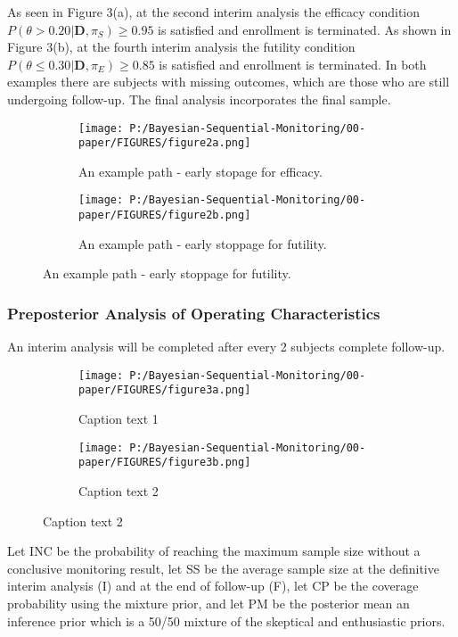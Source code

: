 \documentclass[12pt]{article}
\begin{document}
As seen in Figure 3(a), at the second interim analysis the efficacy condition $P(\theta>0.20|\mathbf{D},\pi_S)\geq 0.95$ is satisfied and enrollment is terminated. As shown in Figure 3(b), at the fourth interim analysis the futility condition $P(\theta\leq 0.30|\mathbf{D},\pi_E)\geq 0.85$ is satisfied and enrollment is terminated. In both examples there are subjects with missing outcomes, which are those who are still undergoing follow-up. The final analysis incorporates the final sample.
\begin{figure}
  \begin{subfigure}{7in}
    \centering\texttt{[image: P:/Bayesian-Sequential-Monitoring/00-paper/FIGURES/figure2a.png]}
    \caption{An example path - early stopage for efficacy.}
	\label{fig:figure2a}
  \end{subfigure}
  \begin{subfigure}{7in}
    \centering\texttt{[image: P:/Bayesian-Sequential-Monitoring/00-paper/FIGURES/figure2b.png]}
    \caption{An example path - early stoppage for futility.}
	\label{fig:figure2b}
  \end{subfigure}
 
\end{figure}
\newpage
\subsubsection{Preposterior Analysis of Operating Characteristics}
An interim analysis will be completed after every 2 subjects complete follow-up.
\begin{figure}
  \begin{subfigure}{7in}
    \centering\texttt{[image: P:/Bayesian-Sequential-Monitoring/00-paper/FIGURES/figure3a.png]}
    \caption{Caption text 1}
  \end{subfigure}
  \begin{subfigure}{7in}
    \centering\texttt{[image: P:/Bayesian-Sequential-Monitoring/00-paper/FIGURES/figure3b.png]}
    \caption{Caption text 2}
  \end{subfigure}
 
\end{figure}

Let INC be the probability of reaching the maximum sample size without a conclusive monitoring result, let SS be the average sample size at the definitive interim analysis (I) and at the end of follow-up (F), let CP be the coverage probability using the mixture prior, and let PM be the posterior mean an inference prior which is a 50/50 mixture of the skeptical and enthusiastic priors.
\end{document}
